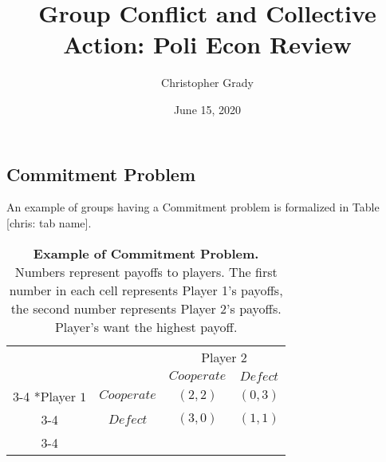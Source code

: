 \documentclass[11pt]{article}
\title{Group Conflict and Collective Action: Poli Econ Review}
\author{
Christopher Grady
}
\date{June 15, 2020}
\begin{document}
\VerbatimFootnotes

%
%
%
%
%
%
%
%
%
%

\maketitle

\hypertarget{commitment-problem}{%
\subsection{Commitment Problem}\label{commitment-problem}}

An example of groups having a Commitment problem is formalized in Table
{[}chris: tab name{]}.

\begin{table}[h!]
\begin{center}
\setlength{\extrarowheight}{2pt}
\begin{tabular}{cc|c|c|}
    & \multicolumn{1}{c}{} & \multicolumn{2}{c}{Player $2$}\\
    & \multicolumn{1}{c}{} & \multicolumn{1}{c}{$Cooperate$}  & \multicolumn{1}{c}{$Defect$} \\\cline{3-4}
    \multirow{2}*{Player $1$}  & $Cooperate$ & $(2,2)$ & $(0,3)$ \\\cline{3-4}
      & $Defect$ & $(3,0)$ & $(1,1)$ \\\cline{3-4}
\end{tabular}
\caption{\label{tab:comProb}\textbf{Example of Commitment Problem.} Numbers represent payoffs to players.  The first number in each cell represents Player 1's payoffs, the second number represents Player 2's payoffs.  Player's want the highest payoff.}
\end{center}
\end{table}
\end{document}
